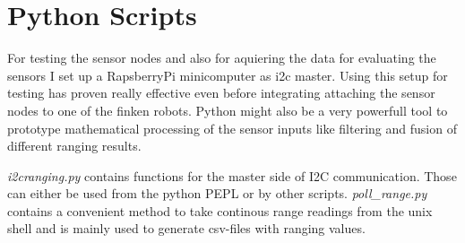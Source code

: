 
%
%

\section{Python Scripts}

For testing the sensor nodes and also for aquiering the data for evaluating the sensors I set up a RapsberryPi minicomputer as i2c master.
Using this setup for testing has proven really effective even before integrating attaching the sensor nodes to one of the finken robots.
Python might also be a very powerfull tool to prototype mathematical processing of the sensor inputs like filtering and fusion of different ranging results.

\emph{i2cranging.py} contains functions for the master side of I2C communication. Those can either be used from the python PEPL or by other scripts.
\emph{poll\_range.py} contains a convenient method to take continous range readings from the unix shell and is mainly used to generate csv-files with ranging values.
